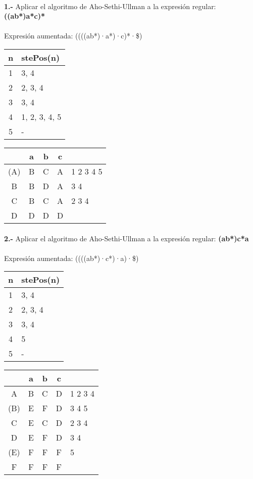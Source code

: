 \documentclass[11pt,a4paper]{report}
\begin{document}
\paragraph{}

\paragraph{}
\textbf{1.-} Aplicar el algoritmo de Aho-Sethi-Ullman a la expresión regular: \textbf{((a\textbar b*)a*c)*} \\
\\
Expresión aumentada: ((((a\textbar b*)·a*)·c)*·\$) \\

\begin{tabular} {| c | l |}
\hline
n & stePos(n) \\ \hline
1 & 3, 4 \\ \hline
2 & 2, 3, 4 \\ \hline
3 & 3, 4 \\ \hline
4 & 1, 2, 3, 4, 5 \\ \hline
5 & - \\ \hline
\end{tabular}
\quad
\begin{tabular} {| c | c |c |c | l |}
\hline 
& a & b & c & \\ \hline
(A) & B & C & A & 1 2 3 4 5 \\ \hline
B & B & D & A & 3 4 \\ \hline
C & B & C & A & 2 3 4 \\ \hline
D & D & D & D & \\ \hline
\end{tabular}\paragraph{}
\textbf{2.-} Aplicar el algoritmo de Aho-Sethi-Ullman a la expresión regular: \textbf{(a\textbar b*)c*a} \\
\\
Expresión aumentada: ((((a\textbar b*)·c*)·a)·\$) \\

\begin{tabular} {| c | l |}
\hline
n & stePos(n) \\ \hline
1 & 3, 4 \\ \hline
2 & 2, 3, 4 \\ \hline
3 & 3, 4 \\ \hline
4 & 5 \\ \hline
5 & - \\ \hline
\end{tabular}
\quad
\begin{tabular} {| c | c |c |c | l |}
\hline 
& a & b & c & \\ \hline
A & B & C & D & 1 2 3 4 \\ \hline
(B) & E & F & D & 3 4 5 \\ \hline
C & E & C & D & 2 3 4 \\ \hline
D & E & F & D & 3 4 \\ \hline
(E) & F & F & F & 5 \\ \hline
F & F & F & F & \\ \hline
\end{tabular}
\end{document}
